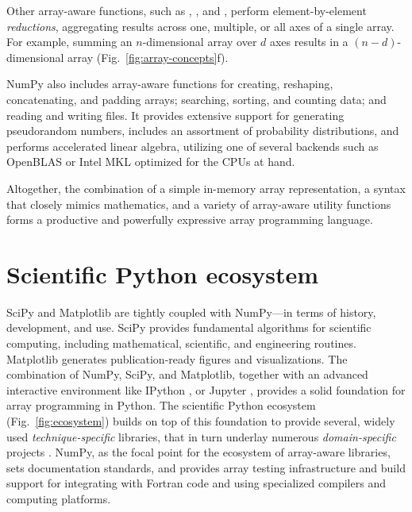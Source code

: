 Other array-aware functions, such as , , and , perform
element-by-element \emph{reductions}, aggregating results across one,
multiple, or all axes of a single array.
For example, summing an $n$-dimensional array over $d$ axes results in a
$(n-d)$-dimensional array (Fig.~\ref{fig:array-concepts}f).

NumPy also includes array-aware functions for creating, reshaping, concatenating, and padding
arrays; searching, sorting, and counting data; and reading and writing files.
It provides extensive support for generating pseudorandom numbers,
includes an assortment of probability distributions, and
performs accelerated linear algebra, utilizing one of several backends
such as OpenBLAS \cite{wang2013augem,xianyi2012model} or Intel MKL optimized
for the CPUs at hand.

Altogether, the combination of a simple in-memory array
representation, a syntax that closely mimics mathematics, and a
variety of array-aware utility functions forms a productive and
powerfully expressive array programming language.

\section*{Scientific Python ecosystem}

SciPy and Matplotlib are tightly coupled with NumPy---in terms of
history, development, and use.
SciPy provides fundamental algorithms for scientific computing,
including mathematical, scientific, and engineering routines.
Matplotlib generates publication-ready figures and visualizations.
The combination of NumPy, SciPy, and Matplotlib, together with
an advanced interactive environment like IPython \cite{perez2007ipython},
or Jupyter \cite{Kluyver:2016aa}, provides a solid foundation for array
programming in Python.
The scientific Python ecosystem (Fig.~\ref{fig:ecosystem}) builds on top of
this foundation to provide several, widely used \emph{technique-specific}
libraries\cite{pedregosa2011scikit,vanderwalt2014scikit,SciPyProceedings_11},
that in turn underlay numerous \emph{domain-specific} projects
\cite{astropy:2013,astropy:2018,cock2009biopython,millman2007analysis,sunpy2015,2018EGUGA..2012146H}.
NumPy, as the focal point for the ecosystem of array-aware libraries,
sets documentation standards, and provides array testing infrastructure
and build support for integrating with Fortran code and using specialized
compilers and computing platforms.

